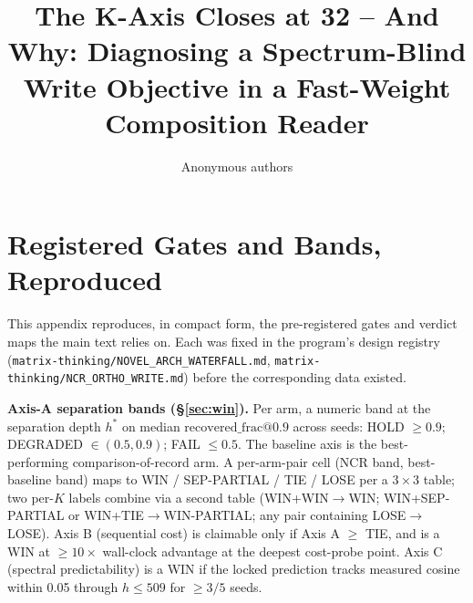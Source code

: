 \documentclass{article} %
\title{The K-Axis Closes at 32 -- And Why: Diagnosing a Spectrum-Blind
Write Objective in a Fast-Weight Composition Reader}
\author{Anonymous authors}
\begin{document}
\ifcolmsubmission
\linenumbers
\fi

\maketitle














\appendix

\section{Registered Gates and Bands, Reproduced}
\label{app:gates}

This appendix reproduces, in compact form, the pre-registered gates and
verdict maps the main text relies on. Each was fixed in the program's
design registry (\texttt{matrix-thinking/NOVEL\_ARCH\_WATERFALL.md},
\texttt{matrix-thinking/NCR\_ORTHO\_WRITE.md}) before the corresponding
data existed.

\textbf{Axis-A separation bands (\S\ref{sec:win}).} Per arm, a numeric
band at the separation depth $h^\ast$ on median $\mathrm{recovered\_frac@0.9}$
across seeds: HOLD $\geq 0.9$; DEGRADED $\in (0.5, 0.9)$; FAIL $\leq 0.5$.
The baseline axis is the best-performing comparison-of-record arm. A
per-arm-pair cell (NCR band, best-baseline band) maps to WIN / SEP-PARTIAL
/ TIE / LOSE per a $3\times3$ table; two per-$K$ labels combine via a
second table (WIN+WIN$\to$WIN; WIN+SEP-PARTIAL or WIN+TIE$\to$WIN-PARTIAL;
any pair containing LOSE$\to$LOSE).
Axis B (sequential cost) is claimable only if Axis A $\geq$ TIE, and is a
WIN at $\geq 10\times$ wall-clock advantage at the deepest cost-probe
point. Axis C (spectral predictability) is a WIN if the locked prediction
tracks measured cosine within 0.05 through $h \leq 509$ for $\geq 3/5$
seeds.
\end{document}
